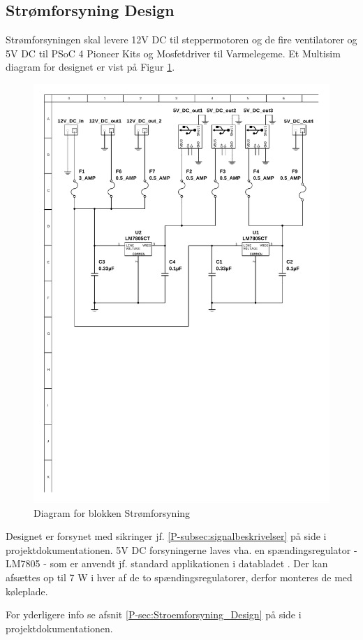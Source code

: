 \subsection{Strømforsyning Design}
\label{ch:stroemforsyning_design}

Strømforsyningen skal levere 12V DC til steppermotoren og de fire ventilatorer og 5V DC til PSoC 4 Pioneer Kits og Mosfetdriver til Varmelegeme.
Et Multisim diagram for designet er vist på Figur \ref{fig:multisim_stroemforsyning}.

\begin{figure}[h]
\centering 
\includegraphics[width={\textwidth}, trim=50 350 30 40, clip=true] {../fig/multisim_stroemforsyning.pdf}
\caption{Diagram for blokken Strømforsyning}
\label{fig:multisim_stroemforsyning}
\end{figure}

Designet er forsynet med sikringer jf. \ref{P-subsec:signalbeskrivelser}  på side \pageref{P-subsec:signalbeskrivelser} i projektdokumentationen.
5V DC forsyningerne laves vha. en spændingsregulator - LM7805 - som er anvendt jf. standard applikationen i databladet \cite{lib:LM7805_DS}.
Der kan afsættes op til 7 W i hver af de to spændingsregulatorer, derfor monteres de med køleplade.

\mbox{}

For yderligere info se afsnit \ref{P-sec:Stroemforsyning_Design}  på side \pageref{P-sec:Stroemforsyning_Design} i projektdokumentationen.

\clearpage